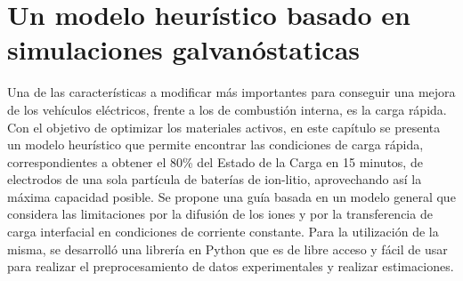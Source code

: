 \chapter{Un modelo heurístico basado en simulaciones galvanóstaticas}\label{ch:un}
\thispagestyle{empty}

\vspace{50pt}

\begin{adjustwidth}{50pt}{50pt}
    Una de las características a modificar más importantes para conseguir una mejora de los 
    vehículos eléctricos, frente a los de combustión interna, es la carga rápida.
    Con el objetivo de optimizar los materiales activos, en este
    capítulo se presenta un modelo heurístico que permite encontrar las 
    condiciones de carga rápida, correspondientes a obtener el 80\% del Estado de la Carga en 15 minutos, de
    electrodos de una sola partícula de baterías de ion-litio, aprovechando así
    la máxima capacidad posible. Se propone una guía basada en un modelo general 
    que considera las limitaciones por la difusión de los iones y por la transferencia de carga interfacial
    en condiciones de corriente constante. Para la utilización de la misma, se 
    desarrolló una librería en Python que es de libre acceso y fácil de usar para 
    realizar el preprocesamiento de datos experimentales y realizar estimaciones.
\end{adjustwidth}

\clearpage
\newpage
\thispagestyle{empty}
\mbox{}
\newpage





